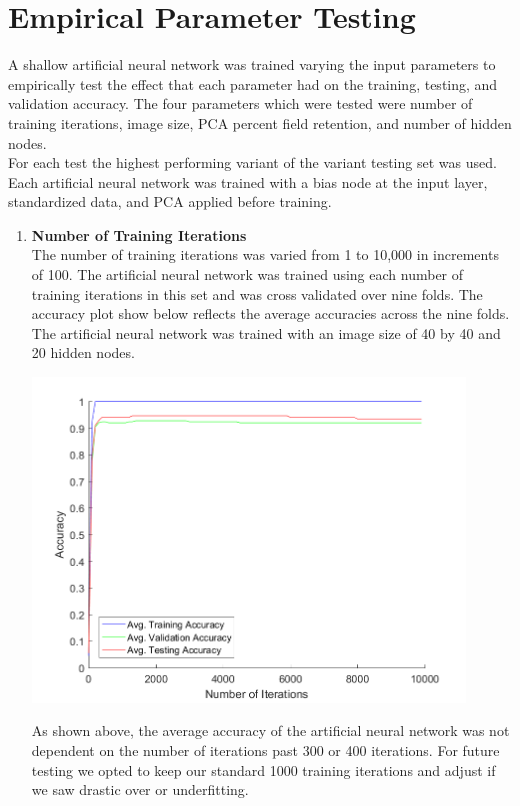 \documentclass[12pt]{article}
\begin{document}
\section{Empirical Parameter Testing}
A shallow artificial neural network was trained varying the input parameters to empirically test the effect that each parameter had on the training, testing, and validation accuracy. The four parameters which were tested were number of training iterations, image size, PCA percent field retention, and number of hidden nodes.\\
For each test the highest performing variant of the variant testing set was used. Each artificial neural network was trained with a bias node at the input layer, standardized data, and PCA applied before training.\\
\begin{enumerate}
  \item \textbf{Number of Training Iterations}\\
  The number of training iterations was varied from 1 to 10,000 in increments of 100. The artificial neural network was trained using each number of training iterations in this set and was cross validated over nine folds. The accuracy plot show below reflects the average accuracies across the nine folds. The artificial neural network was trained with an image size of 40 by 40 and 20 hidden nodes.\\
  \begin{center}
    \includegraphics[width=115mm]{./figs/num_iterations_empirical.png}
    \label{fig:img_iters}
  \end{center}
  As shown above, the average accuracy of the artificial neural network was not dependent on the number of iterations past 300 or 400 iterations. For future testing we opted to keep our standard 1000 training iterations and adjust if we saw drastic over or underfitting.\\


\end{enumerate}
\end{document}
